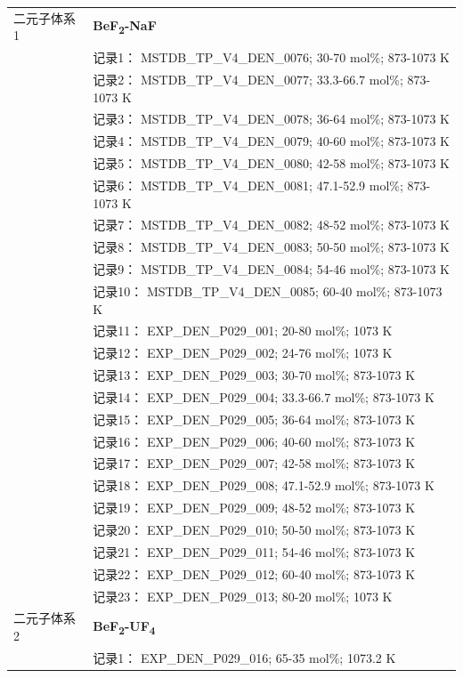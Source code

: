 \documentclass[12pt]{article}
\begin{document}
{\begin{longtable}[]{@{}
  >{\raggedright\arraybackslash}p{}
  >{\raggedright\arraybackslash}p{}@{}}
二元子体系 1  & \textbf{BeF\textsubscript{2}-NaF} \\
 & 记录1： MSTDB\_TP\_V4\_DEN\_0076; 30-70 mol\%; 873-1073 K \\
 & 记录2： MSTDB\_TP\_V4\_DEN\_0077; 33.3-66.7 mol\%; 873-1073 K \\
 & 记录3： MSTDB\_TP\_V4\_DEN\_0078; 36-64 mol\%; 873-1073 K \\
 & 记录4： MSTDB\_TP\_V4\_DEN\_0079; 40-60 mol\%; 873-1073 K \\
 & 记录5： MSTDB\_TP\_V4\_DEN\_0080; 42-58 mol\%; 873-1073 K \\
 & 记录6： MSTDB\_TP\_V4\_DEN\_0081; 47.1-52.9 mol\%; 873-1073 K \\
 & 记录7： MSTDB\_TP\_V4\_DEN\_0082; 48-52 mol\%; 873-1073 K \\
 & 记录8： MSTDB\_TP\_V4\_DEN\_0083; 50-50 mol\%; 873-1073 K \\
 & 记录9： MSTDB\_TP\_V4\_DEN\_0084; 54-46 mol\%; 873-1073 K \\
 & 记录10： MSTDB\_TP\_V4\_DEN\_0085; 60-40 mol\%; 873-1073 K \\
 & 记录11： EXP\_DEN\_P029\_001; 20-80 mol\%; 1073 K \\
 & 记录12： EXP\_DEN\_P029\_002; 24-76 mol\%; 1073 K \\
 & 记录13： EXP\_DEN\_P029\_003; 30-70 mol\%; 873-1073 K \\
 & 记录14： EXP\_DEN\_P029\_004; 33.3-66.7 mol\%; 873-1073 K \\
 & 记录15： EXP\_DEN\_P029\_005; 36-64 mol\%; 873-1073 K \\
 & 记录16： EXP\_DEN\_P029\_006; 40-60 mol\%; 873-1073 K \\
 & 记录17： EXP\_DEN\_P029\_007; 42-58 mol\%; 873-1073 K \\
 & 记录18： EXP\_DEN\_P029\_008; 47.1-52.9 mol\%; 873-1073 K \\
 & 记录19： EXP\_DEN\_P029\_009; 48-52 mol\%; 873-1073 K \\
 & 记录20： EXP\_DEN\_P029\_010; 50-50 mol\%; 873-1073 K \\
 & 记录21： EXP\_DEN\_P029\_011; 54-46 mol\%; 873-1073 K \\
 & 记录22： EXP\_DEN\_P029\_012; 60-40 mol\%; 873-1073 K \\
 & 记录23： EXP\_DEN\_P029\_013; 80-20 mol\%; 1073 K  \\

二元子体系 2  & \textbf{BeF\textsubscript{2}-UF\textsubscript{4}} \\
 & 记录1： EXP\_DEN\_P029\_016; 65-35 mol\%; 1073.2 K  \\


\end{longtable}}
\end{document}
